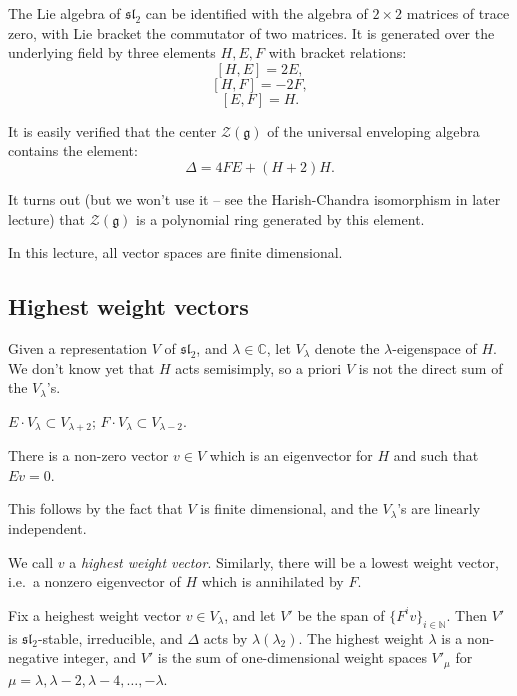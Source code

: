 The Lie algebra of $\mathfrak{sl}_2$ can be identified with the algebra of $2\times 2$ matrices of trace zero, with Lie bracket the commutator of two matrices. It is generated over the underlying field by three elements $H, E, F$ with bracket relations:
$$[H,E]=2E,$$
$$[H,F]=-2F,$$
$$[E,F] = H.$$

It is easily verified that the center $\mathcal Z(\mathfrak g)$ of the universal enveloping algebra contains the element:
$$\Delta = 4FE + (H+2) H.$$

It turns out (but we won't use it -- see the Harish-Chandra isomorphism in later lecture) that $\mathcal Z(\mathfrak g)$ is a polynomial ring generated by this element.

In this lecture, all vector spaces are finite dimensional.

\subsection{Highest weight vectors}

Given a representation $V$ of $\mathfrak{sl}_2$, and $\lambda\in \mathbb C$, let $V_\lambda$ denote the $\lambda$-eigenspace of $H$. We don't know yet that $H$ acts semisimply, so a priori $V$ is not the direct sum of the $V_\lambda$'s. 

\begin{lemma}
 $E\cdot V_\lambda\subset V_{\lambda+2}$; $F\cdot V_\lambda\subset V_{\lambda-2}$.
\end{lemma}

\begin{proposition}
 There is a non-zero vector $v\in V$ which is an eigenvector for $H$ and such that $Ev=0$.
\end{proposition}

This follows by the fact that $V$ is finite dimensional, and the $V_\lambda$'s are linearly independent.

We call $v$ a \emph{highest weight vector}. Similarly, there will be a lowest weight vector, i.e.\ a nonzero eigenvector of $H$ which is annihilated by $F$.

\begin{proposition}\label{sl2prop}
 Fix a heighest weight vector $v\in V_\lambda$, and let $V'$ be the span of $\{F^iv\}_{i\in\mathbb N}$. Then $V'$ is $\mathfrak{sl}_2$-stable, irreducible, and $\Delta$ acts by $\lambda(\lambda_2)$. The highest weight $\lambda$ is a non-negative integer, and $V'$ is the sum of one-dimensional weight spaces $V'_{\mu}$ for $\mu = \lambda, \lambda-2,\lambda-4, \dots, -\lambda$.
\end{proposition}

